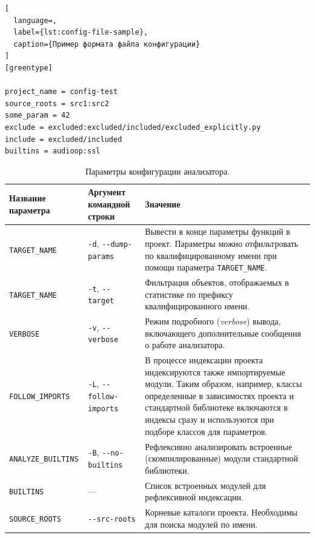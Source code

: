 \begin{lstlisting}[
  language=,
  label={lst:config-file-sample},
  caption={Пример формата файла конфигурации}
]
[greentype]

project_name = config-test
source_roots = src1:src2
some_param = 42
exclude = excluded:excluded/included/excluded_explicitly.py
include = excluded/included
builtins = audioop:ssl
\end{lstlisting}

\begin{table}[H]
  \small
  \caption{Параметры конфигурации анализатора.}
  \label{tab:config-ref}
  \begin{tabularx}{\textwidth}{ |X|X|X| }
    \hline
    Название параметра & Аргумент командной строки & Значение \\
    \hline

    \texttt{TARGET\_NAME} & \texttt{-d}, \texttt{-{}-dump-params} & Вывести
    в конце параметры функций в проект. Параметры можно отфильтровать по
    квалифицированному имени при помощи параметра \texttt{TARGET\_NAME}.
    \\ \hline

    \texttt{TARGET\_NAME} & \texttt{-t}, \texttt{-{}-target} &  Фильтрация
    объектов, отображаемых в статистике по префиксу квалифицированного имени.
    \\ \hline

    \texttt{VERBOSE} & \texttt{-v}, \texttt{-{}-verbose} & Режим подробного
    (\emph{verbose}) вывода, включающего дополнительные сообщения о работе
    анализатора.
    \\ \hline

    \texttt{FOLLOW\_IMPORTS} & \texttt{-L}, \texttt{-{}-follow-imports} & 
    В процессе индексации проекта индексируются также импортируемые модули.
    Таким образом, например, классы определенные в зависимостях проекта и
    стандартной библиотеке включаются в индексы сразу и используются при подборе
    классов для параметров.
    \\ \hline

    \texttt{ANALYZE\_BUILTINS} & \texttt{-B}, \texttt{-{}-no-builtins} &
    Рефлексивно анализировать встроенные (скомпилированные) модули стандартной
    библиотеки.
    \\ \hline

    \texttt{BUILTINS} & --- & Список встроенных модулей для рефлексивной
    индексации.
    \\ \hline
    
    \texttt{SOURCE\_ROOTS} & \texttt{-{}-src-roots} & Корневые каталоги проекта.
    Необходимы для поиска модулей по имени.  
    \\ \hline


\end{tabularx}
\end{table}
